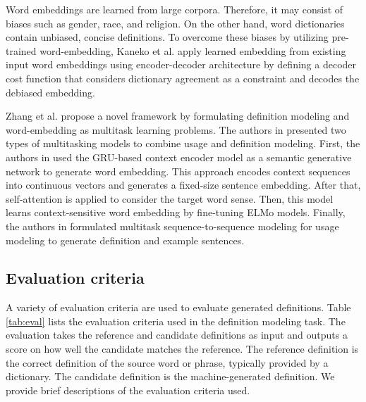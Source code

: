 Word embeddings are learned from large corpora. Therefore, it may consist of
biases such as gender, race, and religion. On the other hand, word dictionaries
contain unbiased, concise definitions. To overcome these biases by utilizing
pre-trained word-embedding, Kaneko et al. \cite{kaneko_dictionary_2021} apply
learned embedding from existing input word embeddings using encoder-decoder
architecture by defining a decoder cost function that considers dictionary
agreement as a constraint and decodes the debiased embedding.

Zhang et al. \cite{zhang_improving_2020} propose a novel framework by
formulating definition modeling and word-embedding as multitask learning
problems. The authors in \cite{zhang_improving_2020} presented two types of multitasking models to combine
usage and definition modeling. First, the authors in \cite{zhang_improving_2020} used the GRU-based context
encoder model as a semantic generative network to generate word embedding. This
approach encodes context sequences into continuous vectors and generates a
fixed-size sentence embedding. After that, self-attention is applied to consider
the target word sense. Then, this model learns context-sensitive word embedding by
fine-tuning ELMo models. Finally, the authors in \cite{zhang_improving_2020} formulated multitask sequence-to-sequence modeling for usage modeling to generate definition and example sentences.

\subsection{Evaluation criteria}

A variety of evaluation criteria are used to evaluate generated definitions.
Table \ref{tab:eval} lists the evaluation criteria used in the definition
modeling task. The evaluation takes the reference and candidate definitions as input and outputs a score on how well the candidate matches the reference. The reference definition is
the correct definition of the source word or phrase, typically provided by a
dictionary. The candidate definition is the machine-generated definition. We
provide brief descriptions of the evaluation criteria used.

